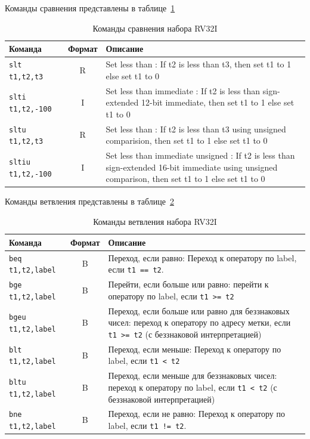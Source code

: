 Команды сравнения представлены в таблице~\ref{table-base-compare}

\begin{table}[h]
    \caption{Команды сравнения набора RV32I}
    \centering
    \begin{tabularx}{\textwidth}{|l|c|X|}
        \hline
        \textbf{Команда} & \textbf{Формат} & \textbf{Описание} \\
        \hline \verb|slt t1,t2,t3| & R & Set less than : If t2 is less than t3, then set t1 to 1 else set t1 to 0 \\
        \hline \verb|slti t1,t2,-100| & I & Set less than immediate : If t2 is less than sign-extended 12-bit immediate, then set t1 to 1 else set t1 to 0 \\
        \hline \verb|sltu t1,t2,t3| & R & Set less than : If t2 is less than t3 using unsigned comparision, then set t1 to 1 else set t1 to 0 \\
        \hline \verb|sltiu t1,t2,-100| & I & Set less than immediate unsigned : If t2 is less than sign-extended 16-bit immediate using unsigned comparison, then set t1 to 1 else set t1 to 0 \\
        \hline
    \end{tabularx}
    \label{table-base-compare}
\end{table}

Команды ветвления представлены в таблице~\ref{table-base-branch}

\begin{table}[h]
    \caption{Команды ветвления набора RV32I}
    \centering
    \begin{tabularx}{\textwidth}{|l|c|X|}
        \hline
        \textbf{Команда} & \textbf{Формат} & \textbf{Описание} \\
        \hline \verb|beq t1,t2,label| & B & Переход, если равно: Переход к оператору по label, если \verb|t1 == t2|. \\
        \hline \verb|bge t1,t2,label| & B & Перейти, если больше или равно: перейти к оператору по label, если \verb|t1 >= t2| \\
        \hline \verb|bgeu t1,t2,label| & B & Переход, если больше или равно для беззнаковых чисел: переход к оператору по адресу метки, если \verb|t1 >= t2| (с беззнаковой интерпретацией)  \\
        \hline \verb|blt t1,t2,label| & B & Переход, если меньше: Переход к оператору по label, если \verb|t1 < t2| \\
        \hline \verb|bltu t1,t2,label| & B & Переход, если меньше для беззнаковых чисел: переход к оператору по label, если \verb|t1 < t2| (с беззнаковой интерпретацией) \\
        \hline \verb|bne t1,t2,label| & B & Переход, если не равно: Переход к оператору по label, если \verb|t1 != t2|. \\
        \hline
    \end{tabularx}
    \label{table-base-branch}
\end{table}

